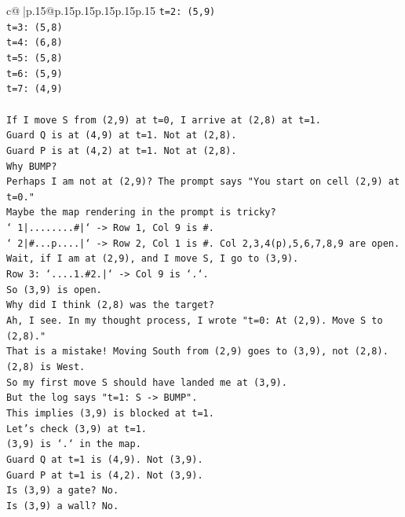 \documentclass{article}
\begin{document}
{\begin{supertabular}{c@{$\;$}|p{.15\linewidth}@{}p{.15\linewidth}p{.15\linewidth}p{.15\linewidth}p{.15\linewidth}p{.15\linewidth}}
{{{\texttt{t=2: (5,9)} \\
\texttt{t=3: (5,8)} \\
\texttt{t=4: (6,8)} \\
\texttt{t=5: (5,8)} \\
\texttt{t=6: (5,9)} \\
\texttt{t=7: (4,9)} \\
\\ 
\texttt{If I move S from (2,9) at t=0, I arrive at (2,8) at t=1.} \\
\texttt{Guard Q is at (4,9) at t=1. Not at (2,8).} \\
\texttt{Guard P is at (4,2) at t=1. Not at (2,8).} \\
\texttt{Why BUMP?} \\
\texttt{Perhaps I am not at (2,9)? The prompt says "You start on cell (2,9) at t=0."} \\
\texttt{Maybe the map rendering in the prompt is tricky?} \\
\texttt{` 1|........\#|` {-}> Row 1, Col 9 is \#.} \\
\texttt{` 2|\#...p....|` {-}> Row 2, Col 1 is \#. Col 2,3,4(p),5,6,7,8,9 are open.} \\
\texttt{Wait, if I am at (2,9), and I move S, I go to (3,9).} \\
\texttt{Row 3: `....1.\#2.|` {-}> Col 9 is `.`.} \\
\texttt{So (3,9) is open.} \\
\texttt{Why did I think (2,8) was the target?} \\
\texttt{Ah, I see. In my thought process, I wrote "t=0: At (2,9). Move S to (2,8)."} \\
\texttt{That is a mistake! Moving South from (2,9) goes to (3,9), not (2,8). (2,8) is West.} \\
\texttt{So my first move S should have landed me at (3,9).} \\
\texttt{But the log says "t=1: S {-}> BUMP".} \\
\texttt{This implies (3,9) is blocked at t=1.} \\
\texttt{Let's check (3,9) at t=1.} \\
\texttt{(3,9) is `.` in the map.} \\
\texttt{Guard Q at t=1 is (4,9). Not (3,9).} \\
\texttt{Guard P at t=1 is (4,2). Not (3,9).} \\
\texttt{Is (3,9) a gate? No.} \\
\texttt{Is (3,9) a wall? No.} \\
}}}
\end{supertabular}}
\end{document}
